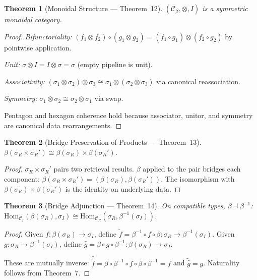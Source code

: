 \documentclass{article}
\newtheorem{theorem}{Theorem}
\theoremstyle{definition}
\theoremstyle{remark}
\begin{document}
\begin{theorem}[Monoidal Structure --- Theorem~12]\label{thm:monoidal}
$(\mathcal{C}_\beta, \otimes, I)$ is a symmetric monoidal category.
\end{theorem}

\begin{proof}
\emph{Bifunctoriality:} $(f_1 \otimes f_2) \circ (g_1 \otimes g_2) = (f_1 \circ g_1) \otimes (f_2 \circ g_2)$ by pointwise application.

\emph{Unit:} $\sigma \otimes I = I \otimes \sigma = \sigma$ (empty pipeline is unit).

\emph{Associativity:} $(\sigma_1 \otimes \sigma_2) \otimes \sigma_3 \cong \sigma_1 \otimes (\sigma_2 \otimes \sigma_3)$ via canonical reassociation.

\emph{Symmetry:} $\sigma_1 \otimes \sigma_2 \cong \sigma_2 \otimes \sigma_1$ via swap.

Pentagon and hexagon coherence hold because associator, unitor, and symmetry are canonical data rearrangements.
\end{proof}

\begin{theorem}[Bridge Preservation of Products --- Theorem~13]\label{thm:bridge-products}
$\beta(\sigma_R \times \sigma_R') \cong \beta(\sigma_R) \times \beta(\sigma_R')$.
\end{theorem}

\begin{proof}
$\sigma_R \times \sigma_R'$ pairs two retrieval results. $\beta$ applied to the pair bridges each component: $\beta(\sigma_R \times \sigma_R') = (\beta(\sigma_R), \beta(\sigma_R'))$. The isomorphism with $\beta(\sigma_R) \times \beta(\sigma_R')$ is the identity on underlying data.
\end{proof}

\begin{theorem}[Bridge Adjunction --- Theorem~14]\label{thm:adjunction}
On compatible types, $\beta \dashv \beta^{-1}$:
$\mathrm{Hom}_{\mathcal{C}_I}(\beta(\sigma_R), \sigma_I) \cong \mathrm{Hom}_{\mathcal{C}_R}(\sigma_R, \beta^{-1}(\sigma_I))$.
\end{theorem}

\begin{proof}
Given $f : \beta(\sigma_R) \to \sigma_I$, define $\tilde{f} = \beta^{-1} \circ f \circ \beta : \sigma_R \to \beta^{-1}(\sigma_I)$.
Given $g : \sigma_R \to \beta^{-1}(\sigma_I)$, define $\hat{g} = \beta \circ g \circ \beta^{-1} : \beta(\sigma_R) \to \sigma_I$.

These are mutually inverse: $\hat{\tilde{f}} = \beta \circ \beta^{-1} \circ f \circ \beta \circ \beta^{-1} = f$ and $\tilde{\hat{g}} = g$. Naturality follows from Theorem~7.
\end{proof}
\end{document}
